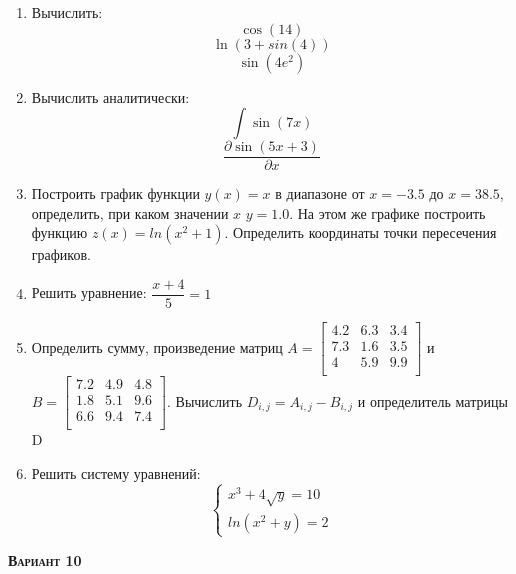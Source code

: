 \begin{enumerate}
\item Вычислить: 
\begin{equation*}\cos(14)                          \end{equation*}
\begin{equation*}\ln(3+sin(4))                     \end{equation*}
\begin{equation*}\sin(4 e^2)                       \end{equation*}

\item Вычислить аналитически: 
 \begin{equation*} \int \sin(7x)           \end{equation*}\begin{equation*} {\dfrac{\partial \sin(5 x +3)}{\partial x}} \end{equation*}
\item Построить график функции $y(x)=x                $ в диапазоне от $x=-3.5$ до $x=38.5$, определить, при каком значении $x$ $y=1.0$. На этом же графике построить функцию $z(x)=ln(x^2+1)                 $. Определить координаты точки пересечения графиков. \item Решить уравнение: $\dfrac{x+4}{5}=1     $

\item Определить сумму, произведение матриц $A=\begin{bmatrix}
4.2 &6.3 &3.4 \\
7.3 &1.6 &3.5 \\
4 &5.9 &9.9 \\
\end{bmatrix}
$ и $B=\begin{bmatrix}
7.2 &4.9 &4.8 \\
1.8 &5.1 &9.6 \\
6.6 &9.4 &7.4 \\
\end{bmatrix}
$. Вычислить $D_{i,j}=A_{i,j}  -  B_{i,j}$ и определитель матрицы D

\item Решить систему уравнений: \begin{equation*} \begin{cases} x^3+4 \sqrt{y}=10    \\ ln(x^2+y)=2           \end{cases} \end{equation*} 

\end{enumerate}
\textsc{\textbf{Вариант 10}}

